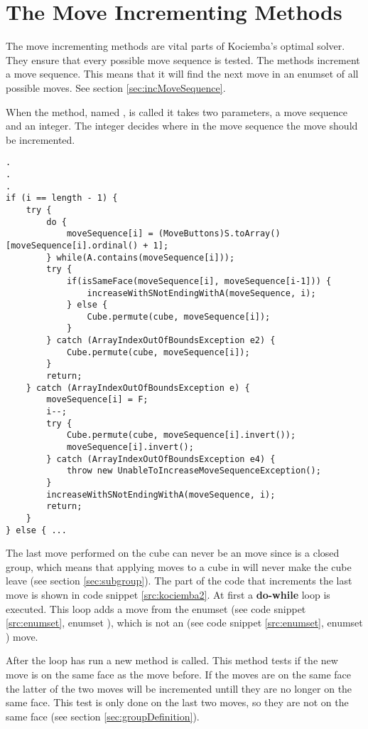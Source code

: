 \section{The Move Incrementing Methods}
\label{sec:increaseWithSNotEndingWithA}
The move incrementing methods are vital parts of Kociemba's optimal solver. 
They ensure that every possible move sequence is tested.
The methods increment a move sequence. This means that it will find the next move in an enumset of all possible moves. See section \ref{sec:incMoveSequence}.


When the method, named , is called it takes two parameters, a move sequence and an integer.
The integer decides where in the move sequence the move should be incremented. 


\begin{lstlisting}[style=sourceCode, caption=\myCaption{Key point in the incrementing method of kociemba's optimal solver}, label=src:kociemba2]
.
.
.
if (i == length - 1) {
	try {
		do {
			moveSequence[i] = (MoveButtons)S.toArray()[moveSequence[i].ordinal() + 1];
		} while(A.contains(moveSequence[i]));
		try {
			if(isSameFace(moveSequence[i], moveSequence[i-1])) {
				increaseWithSNotEndingWithA(moveSequence, i);
			} else {
				Cube.permute(cube, moveSequence[i]);
			}
		} catch (ArrayIndexOutOfBoundsException e2) {
			Cube.permute(cube, moveSequence[i]);
		}
		return;
	} catch (ArrayIndexOutOfBoundsException e) {
		moveSequence[i] = F;
		i--;
		try {
			Cube.permute(cube, moveSequence[i].invert());
			moveSequence[i].invert();
		} catch (ArrayIndexOutOfBoundsException e4) {
			throw new UnableToIncreaseMoveSequenceException();
		}
		increaseWithSNotEndingWithA(moveSequence, i);
		return;
	}
} else { ...
\end{lstlisting}

The last move performed on the cube can never be an  move since  is a closed group, which means that applying  moves to a cube in  will never make the cube leave  (see section \ref{sec:subgroup}). The part of the code that increments the last move is shown in code snippet \ref{src:kociemba2}.
At first a \textbf{do-while} loop is executed. 
This loop adds a move from the enumset  (see code snippet \ref{src:enumset}, enumset ), which is not an  (see code snippet \ref{src:enumset}, enumset ) move.

After the loop has run a new method  is called.
This method tests if the new move is on the same face as the move before.
If the moves are on the same face the latter of the two moves will be incremented untill they are no longer on the same face.
This test is only done on the last two moves, so they are not on the same face (see section \ref{sec:groupDefinition}).

